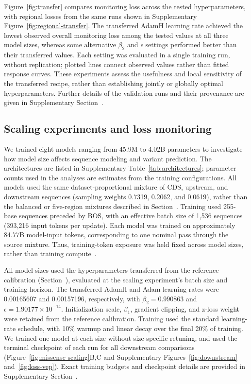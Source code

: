 \documentclass[a4paper,num-refs]{oup-contemporary}
\begin{document}
Figure~\ref{fig:transfer} compares monitoring loss across the
tested hyperparameters, with regional losses from the same runs
shown in Supplementary Figure~\ref{fig:regional-transfer}.
The transferred AdamH learning rate achieved the lowest observed
overall monitoring loss among the tested values at all three model
sizes, whereas some alternative $\beta_2$ and $\epsilon$ settings
performed better than their transferred values.
Each setting was evaluated in a single training run, without
replication; plotted lines connect observed values rather than
fitted response curves.
These experiments assess the usefulness and local sensitivity of
the transferred recipe, rather than establishing jointly or
globally optimal hyperparameters.
Further details of the validation runs and their provenance are
given in Supplementary Section~.


\subsection{Scaling experiments and loss monitoring}
\label{methods:scaling}

We trained eight models ranging from 45.9M to 4.02B parameters to
investigate how model size affects sequence modeling and variant
prediction. The architectures are listed in Supplementary
Table~\ref{tab:architectures}; parameter counts used in the analyses
are estimates from the training configurations.
All models used the same dataset-proportional mixture of CDS, upstream,
and downstream sequences (sampling weights 0.7319, 0.2062, and 0.0619),
rather than the balanced or five-region mixtures described in
Section~.
Training used 255-base sequences preceded by BOS, with an effective
batch size of 1,536 sequences (393,216 input tokens per update).
Each model was trained on approximately 84.77B model-input tokens,
corresponding to one nominal pass through the source mixture.
Thus, training-token exposure was held fixed across model sizes,
rather than training compute~\citep{marindna109,marin4251,marintransfercode}.

All model sizes used the hyperparameters transferred from the reference
calibration (Section~), evaluated at the
scaling experiment's batch size and training horizon.
The transferred AdamH and Adam learning rates were 0.00165607 and
0.00157196, respectively, with $\beta_2=0.990863$ and
$\epsilon=1.90177\times10^{-14}$.
Initialization scale, $\beta_1$, gradient clipping, and z-loss weight
were retained from the reference calibration.
Training used the standard learning-rate schedule, with 10\% warmup
and linear decay over the final 20\% of training.
We trained one model at each size without size-specific retuning,
and used the terminal checkpoint of each run for all downstream
comparisons (Figure~\ref{fig:missense-scaling}B,C and Supplementary
Figures~\ref{fig:downstream} and~\ref{fig:loss-vep}).
Exact training budgets and checkpoint details are provided in
Supplementary Section~.
\end{document}

